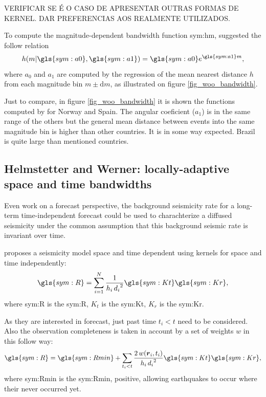 \documentclass[draft, grl]{agutex}
\begin{document}
\begin{article}
VERIFICAR SE É O CASO DE APRESENTAR OUTRAS FORMAS DE KERNEL. DAR PREFERENCIAS AOS REALMENTE UTILIZADOS.


To compute the magnitude-dependent bandwidth function \gls{sym:hm}, \citet{woo_1996} suggested the follow relation
\begin{equation}
	\ensuremath{
		h(m\arrowvert \gls{sym:a0}, \gls{sym:a1}) = \gls{sym:a0}e^{\gls{sym:a1}m},
	}
	\label{eq:hm}
\end{equation}
where $a_0$ and $a_1$ are computed by the regression of the mean nearest distance $h$ from each magnitude bin $m \pm \mathrm{d}m$, as illustrated on figure \ref{fig_woo_bandwidth}.

Just to compare, in figure \ref{fig_woo_bandwidth} it is shown the functions computed by \citet{beauval_2003} for Norway and Spain. The angular coeficient ($a_1$) is in the same range of the others but the general mean distance between events into the same magnitude bin is higher than other countries. It is in some way expected. Brazil is quite large than mentioned countries.



\subsection{Helmstetter and Werner: locally-adaptive space and time bandwidths}


Even work on a forecast perspective, the background seismicity rate for a long-term time-independent forecast could be used to charachterize a diffused seismicity under the common assumption that this background seismic rate is invariant over time.

\citet{helmstetter_2012} proposes a seismicity model space and time dependent using kernels for space and time independently:
\begin{equation}
	\ensuremath{\gls{sym:R} = \sum_{i=1}^{N}{ \frac{1}{h_i\,{d_i}^2} \gls{sym:Kt}\gls{sym:Kr} }},
	\label{eq:helms01}
\end{equation}
where \gls{sym:R} is the \glsdesc{sym:R},
	  $K_t$ is the \glsdesc{sym:Kt},
	  $K_r$ is the \glsdesc{sym:Kr}.


As they are interested in forecast, just past time $t_i < t$ need to be considered. Also the observation completeness is taken in account by a set of weights $w$ in this follow way:
\begin{equation}
\ensuremath{\gls{sym:R} = \gls{sym:Rmin} + \sum_{t_i < t}{
	\frac{2\,w(\boldsymbol{r}_i,t_i)}{h_i\,{d_i}^2}
			\gls{sym:Kt}\gls{sym:Kr} }},
	\label{eq:helms02}
\end{equation}
where \gls{sym:Rmin} is the \glsdesc{sym:Rmin}, positive, allowing earthquakes to occur where their never occurred yet.


\end{article}
\end{document}
